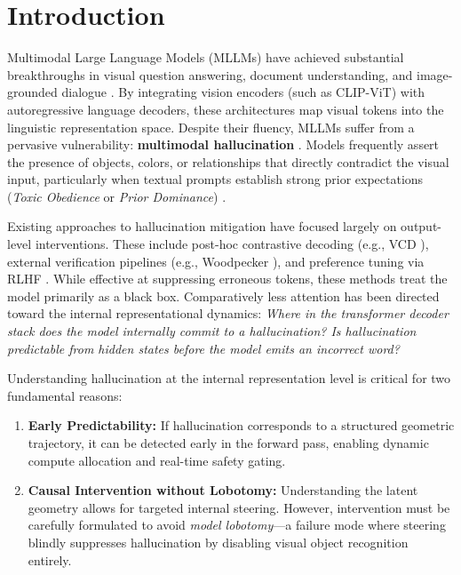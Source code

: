 \documentclass[11pt]{article}
\begin{document}
\newpage
\tableofcontents
\newpage

\setcounter{page}{1}

\section{Introduction}

Multimodal Large Language Models (MLLMs) have achieved substantial breakthroughs in visual question answering, document understanding, and image-grounded dialogue \cite{llava, instructblip}. By integrating vision encoders (such as CLIP-ViT) with autoregressive language decoders, these architectures map visual tokens into the linguistic representation space. Despite their fluency, MLLMs suffer from a pervasive vulnerability: \textbf{multimodal hallucination} \cite{hallucination_survey, vl_hallucination}. Models frequently assert the presence of objects, colors, or relationships that directly contradict the visual input, particularly when textual prompts establish strong prior expectations (\textit{Toxic Obedience} or \textit{Prior Dominance}) \cite{pope, woodpecker}.

Existing approaches to hallucination mitigation have focused largely on output-level interventions. These include post-hoc contrastive decoding (e.g., VCD \cite{vcd}), external verification pipelines (e.g., Woodpecker \cite{woodpecker}), and preference tuning via RLHF \cite{rlhf_v}. While effective at suppressing erroneous tokens, these methods treat the model primarily as a black box. Comparatively less attention has been directed toward the internal representational dynamics: \textit{Where in the transformer decoder stack does the model internally commit to a hallucination? Is hallucination predictable from hidden states before the model emits an incorrect word?}

Understanding hallucination at the internal representation level is critical for two fundamental reasons:
\begin{enumerate}
    \item \textbf{Early Predictability:} If hallucination corresponds to a structured geometric trajectory, it can be detected early in the forward pass, enabling dynamic compute allocation and real-time safety gating.
    \item \textbf{Causal Intervention without Lobotomy:} Understanding the latent geometry allows for targeted internal steering. However, intervention must be carefully formulated to avoid \textit{model lobotomy}---a failure mode where steering blindly suppresses hallucination by disabling visual object recognition entirely.
\end{enumerate}
\end{document}

